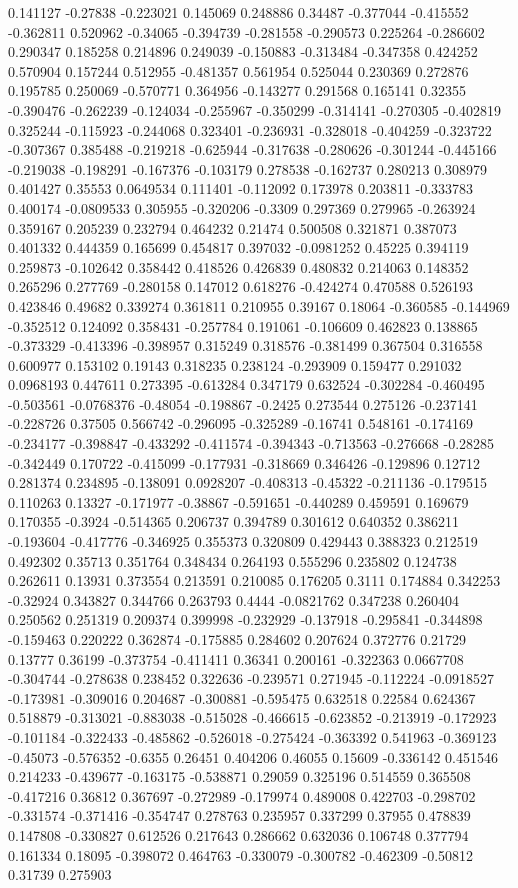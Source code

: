 0.141127 -0.27838 -0.223021 0.145069 0.248886 0.34487 -0.377044 -0.415552 -0.362811 0.520962 -0.34065 -0.394739 -0.281558 -0.290573 0.225264 -0.286602 0.290347 0.185258 0.214896 0.249039 -0.150883 -0.313484 -0.347358 0.424252 0.570904 0.157244 0.512955 -0.481357 0.561954 0.525044 0.230369 0.272876 0.195785 0.250069 -0.570771 0.364956 -0.143277 0.291568 0.165141 0.32355 -0.390476 -0.262239 -0.124034 -0.255967 -0.350299 -0.314141 -0.270305 -0.402819 0.325244 -0.115923 -0.244068 0.323401 -0.236931 -0.328018 -0.404259 -0.323722 -0.307367 0.385488 -0.219218 -0.625944 -0.317638 -0.280626 -0.301244 -0.445166 -0.219038 -0.198291 -0.167376 -0.103179 0.278538 -0.162737 0.280213 0.308979 0.401427 0.35553 0.0649534 0.111401 -0.112092 0.173978 0.203811 -0.333783 0.400174 -0.0809533 0.305955 -0.320206 -0.3309 0.297369 0.279965 -0.263924 0.359167 0.205239 0.232794 0.464232 0.21474 0.500508 0.321871 0.387073 0.401332 0.444359 0.165699 0.454817 0.397032 -0.0981252 0.45225 0.394119 0.259873 -0.102642 0.358442 0.418526 0.426839 0.480832 0.214063 0.148352 0.265296 0.277769 -0.280158 0.147012 0.618276 -0.424274 0.470588 0.526193 0.423846 0.49682 0.339274 0.361811 0.210955 0.39167 0.18064 -0.360585 -0.144969 -0.352512 0.124092 0.358431 -0.257784 0.191061 -0.106609 0.462823 0.138865 -0.373329 -0.413396 -0.398957 0.315249 0.318576 -0.381499 0.367504 0.316558 0.600977 0.153102 0.19143 0.318235 0.238124 -0.293909 0.159477 0.291032 0.0968193 0.447611 0.273395 -0.613284 0.347179 0.632524 -0.302284 -0.460495 -0.503561 -0.0768376 -0.48054 -0.198867 -0.2425 0.273544 0.275126 -0.237141 -0.228726 0.37505 0.566742 -0.296095 -0.325289 -0.16741 0.548161 -0.174169 -0.234177 -0.398847 -0.433292 -0.411574 -0.394343 -0.713563 -0.276668 -0.28285 -0.342449 0.170722 -0.415099 -0.177931 -0.318669 0.346426 -0.129896 0.12712 0.281374 0.234895 -0.138091 0.0928207 -0.408313 -0.45322 -0.211136 -0.179515 0.110263 0.13327 -0.171977 -0.38867 -0.591651 -0.440289 0.459591 0.169679 0.170355 -0.3924 -0.514365 0.206737 0.394789 0.301612 0.640352 0.386211 -0.193604 -0.417776 -0.346925 0.355373 0.320809 0.429443 0.388323 0.212519 0.492302 0.35713 0.351764 0.348434 0.264193 0.555296 0.235802 0.124738 0.262611 0.13931 0.373554 0.213591 0.210085 0.176205 0.3111 0.174884 0.342253 -0.32924 0.343827 0.344766 0.263793 0.4444 -0.0821762 0.347238 0.260404 0.250562 0.251319 0.209374 0.399998 -0.232929 -0.137918 -0.295841 -0.344898 -0.159463 0.220222 0.362874 -0.175885 0.284602 0.207624 0.372776 0.21729 0.13777 0.36199 -0.373754 -0.411411 0.36341 0.200161 -0.322363 0.0667708 -0.304744 -0.278638 0.238452 0.322636 -0.239571 0.271945 -0.112224 -0.0918527 -0.173981 -0.309016 0.204687 -0.300881 -0.595475 0.632518 0.22584 0.624367 0.518879 -0.313021 -0.883038 -0.515028 -0.466615 -0.623852 -0.213919 -0.172923 -0.101184 -0.322433 -0.485862 -0.526018 -0.275424 -0.363392 0.541963 -0.369123 -0.45073 -0.576352 -0.6355 0.26451 0.404206 0.46055 0.15609 -0.336142 0.451546 0.214233 -0.439677 -0.163175 -0.538871 0.29059 0.325196 0.514559 0.365508 -0.417216 0.36812 0.367697 -0.272989 -0.179974 0.489008 0.422703 -0.298702 -0.331574 -0.371416 -0.354747 0.278763 0.235957 0.337299 0.37955 0.478839 0.147808 -0.330827 0.612526 0.217643 0.286662 0.632036 0.106748 0.377794 0.161334 0.18095 -0.398072 0.464763 -0.330079 -0.300782 -0.462309 -0.50812 0.31739 0.275903 